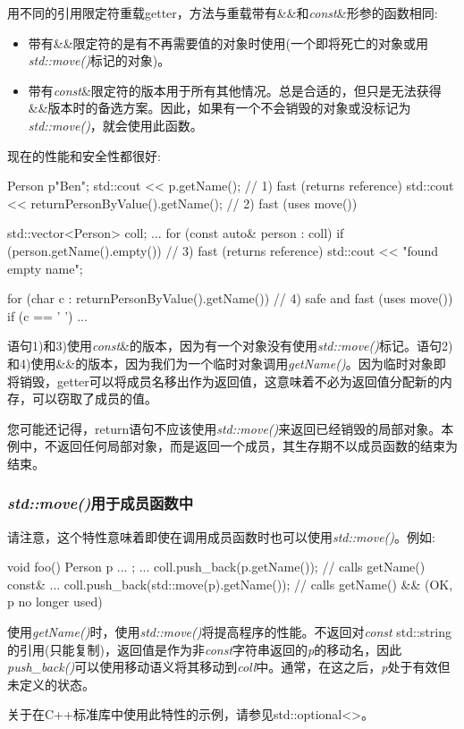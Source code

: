 用不同的引用限定符重载getter，方法与重载带有\&\&和\textit{const}\&形参的函数相同:

\begin{itemize}
	\item 带有\&\&限定符的是有不再需要值的对象时使用(一个即将死亡的对象或用\textit{std::move()}标记的对象)。
	\item 带有\textit{const}\&限定符的版本用于所有其他情况。总是合适的，但只是无法获得\&\&版本时的备选方案。因此，如果有一个不会销毁的对象或没标记为\textit{std::move()}，就会使用此函数。
\end{itemize}

现在的性能和安全性都很好:

\begin{cppcode}
Person p{"Ben"};
std::cout << p.getName(); // 1) fast (returns reference)
std::cout << returnPersonByValue().getName(); // 2) fast (uses move())

std::vector<Person> coll;
...
for (const auto& person : coll) {
	if (person.getName().empty()) { // 3) fast (returns reference)
		std::cout << "found empty name\n";
	}
}

for (char c : returnPersonByValue().getName()) { // 4) safe and fast (uses move())
	if (c == ' ') {
		...
	}
}
\end{cppcode}

语句1)和3)使用\textit{const}\&的版本，因为有一个对象没有使用\textit{std::move()}标记。语句2)和4)使用\&\&的版本，因为我们为一个临时对象调用\textit{getName()}。因为临时对象即将销毁，getter可以将成员名移出作为返回值，这意味着不必为返回值分配新的内存，可以窃取了成员的值。

您可能还记得，return语句不应该使用\textit{std::move()}来返回已经销毁的局部对象。本例中，不返回任何局部对象，而是返回一个成员，其生存期不以成员函数的结束为结束。

\subsubsection{\textit{std::move()}用于成员函数中}

请注意，这个特性意味着即使在调用成员函数时也可以使用\textit{std::move()}。例如:

\begin{cppcode}
void foo()
{
	Person p{ ... };
	...
	coll.push_back(p.getName()); // calls getName() const&
	...
	coll.push_back(std::move(p).getName()); // calls getName() && (OK, p no longer used)
}
\end{cppcode}

使用\textit{getName()}时，使用\textit{std::move()}将提高程序的性能。不返回对\textit{const} std::string的引用(只能复制)，返回值是作为非\textit{const}字符串返回的\textit{p}的移动名，因此\textit{push_back()}可以使用移动语义将其移动到\textit{coll}中。通常，在这之后，\textit{p}处于有效但未定义的状态。

关于在C++标准库中使用此特性的示例，请参见std::optional<>。
















